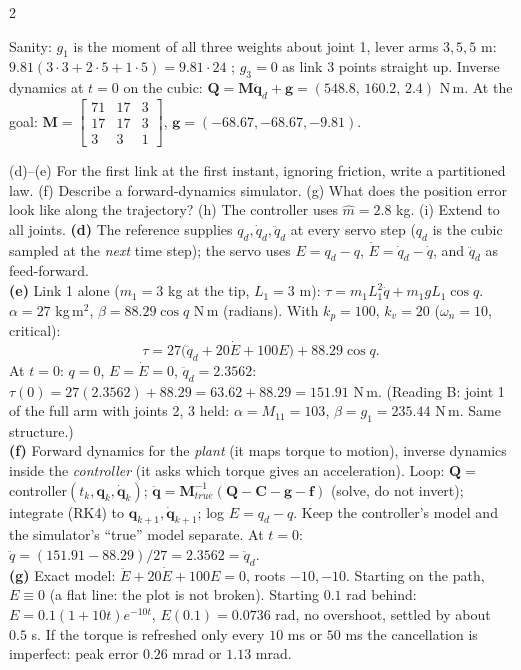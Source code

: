 \begin{multicols}{2}
\begin{examq}
Sanity: $g_1$ is the moment of all three weights about joint 1, lever arms $3,5,5$ m: $9.81(3\cdot3+2\cdot5+1\cdot5)=9.81\cdot24$ \checkmark; $g_3=0$ as link 3 points straight up. Inverse dynamics at $t=0$ on the cubic: $\mathbf Q=\mathbf M\ddot{\mathbf q}_d+\mathbf g=(548.8,\,160.2,\,2.4)$ N\,m. At the goal: $\mathbf M=\begin{bmatrix}71&17&3\\17&17&3\\3&3&1\end{bmatrix}$, $\mathbf g=(-68.67,-68.67,-9.81)$. \chk
\end{examq}
\begin{examq}
(d)--(e) For the first link at the first instant, ignoring friction, write a partitioned law. (f) Describe a forward-dynamics simulator. (g) What does the position error look like along the trajectory? (h) The controller uses $\hat m=2.8$ kg. (i) Extend to all joints.
\solution
\textbf{(d)} The reference supplies $q_d,\dot q_d,\ddot q_d$ at every servo step ($q_d$ is the cubic sampled at the \emph{next} time step); the servo uses $E=q_d-q$, $\dot E=\dot q_d-\dot q$, and $\ddot q_d$ as feed-forward.\\
\textbf{(e)} Link 1 alone ($m_1=3$ kg at the tip, $L_1=3$ m): $\tau=m_1L_1^2\ddot q+m_1gL_1\cos q$. $\alpha=27$ kg\,m$^2$, $\beta=88.29\cos q$ N\,m (radians). With $k_p=100$, $k_v=20$ ($\omega_n=10$, critical):
\[\tau=27\big(\ddot q_d+20\dot E+100E\big)+88.29\cos q.\]
At $t=0$: $q=0$, $E=\dot E=0$, $\ddot q_d=2.3562$: $\tau(0)=27(2.3562)+88.29=63.62+88.29=151.91$ N\,m. (Reading B: joint 1 of the full arm with joints 2, 3 held: $\alpha=M_{11}=103$, $\beta=g_1=235.44$ N\,m. Same structure.) \chk\\
\textbf{(f)} Forward dynamics for the \emph{plant} (it maps torque to motion), inverse dynamics inside the \emph{controller} (it asks which torque gives an acceleration). Loop: $\mathbf Q=$ controller$(t_k,\mathbf q_k,\dot{\mathbf q}_k)$; $\ddot{\mathbf q}=\mathbf M_{true}^{-1}(\mathbf Q-\mathbf C-\mathbf g-\mathbf f)$ (solve, do not invert); integrate (RK4) to $\mathbf q_{k+1},\dot{\mathbf q}_{k+1}$; log $E=q_d-q$. Keep the controller's model and the simulator's ``true'' model separate. At $t=0$: $\ddot q=(151.91-88.29)/27=2.3562=\ddot q_d$. \chk\\
\textbf{(g)} Exact model: $\ddot E+20\dot E+100E=0$, roots $-10,-10$. Starting on the path, $E\equiv0$ (a flat line: the plot is not broken). Starting $0.1$ rad behind: $E=0.1(1+10t)e^{-10t}$, $E(0.1)=0.0736$ rad, no overshoot, settled by about $0.5$ s. If the torque is refreshed only every $10$ ms or $50$ ms the cancellation is imperfect: peak error $0.26$ mrad or $1.13$ mrad. \chk

\end{examq}
\end{multicols}
